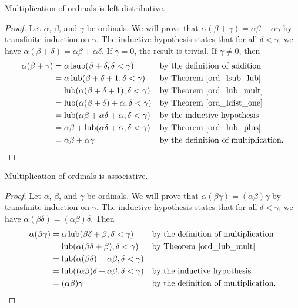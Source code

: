 \documentclass[../../math.tex]{subfiles}
\begin{document}
\begin{instance}
    Multiplication of ordinals is left distributive.
\end{instance}
\begin{proof}
    Let $\alpha$, $\beta$, and $\gamma$ be ordinals.  We will prove that
    $\alpha(\beta + \gamma) = \alpha \beta + \alpha \gamma$ by transfinite
    induction on $\gamma$.  The inductive hypothesis states that for all $\delta
    < \gamma$, we have $\alpha(\beta + \delta) = \alpha \beta + \alpha \delta$.
    If $\gamma = 0$, the result is trivial.  If $\gamma \neq 0$, then
    \begin{align*}
        \alpha(\beta + \gamma)
        &= \alpha \operatorname{lsub}(\beta + \delta, \delta < \gamma)
            && \text{by the definition of addition} \\
        &= \alpha \operatorname{lub}(\beta + \delta + 1, \delta < \gamma)
            && \text{by Theorem \ref{ord_lsub_lub}} \\
        &= \operatorname{lub}(\alpha(\beta + \delta + 1), \delta < \gamma)
            && \text{by Theorem \ref{ord_lub_mult}} \\
        &= \operatorname{lub}(\alpha(\beta + \delta) + \alpha, \delta < \gamma)
            && \text{by Theorem \ref{ord_ldist_one}} \\
        &= \operatorname{lub}(\alpha\beta + \alpha\delta + \alpha, \delta < \gamma)
            && \text{by the inductive hypothesis} \\
        &= \alpha\beta + \operatorname{lub}(\alpha\delta + \alpha, \delta < \gamma)
            && \text{by Theorem \ref{ord_lub_plus}} \\
        &= \alpha\beta + \alpha\gamma
            && \text{by the definition of multiplication.}
    \end{align*}
\end{proof}

\begin{instance}
    Multiplication of ordinals is associative.
\end{instance}
\begin{proof}
    Let $\alpha$, $\beta$, and $\gamma$ be ordinals.  We will prove that
    $\alpha(\beta\gamma) = (\alpha \beta) \gamma$ by transfinite
    induction on $\gamma$.  The inductive hypothesis states that for all $\delta
    < \gamma$, we have $\alpha(\beta\delta) = (\alpha \beta) \delta$.  Then
    \begin{align*}
        \alpha(\beta\gamma)
        &= \alpha \operatorname{lub}(\beta \delta + \beta, \delta < \gamma)
            && \text{by the definition of multiplication} \\
        &= \operatorname{lub}(\alpha(\beta \delta + \beta), \delta < \gamma)
            && \text{by Theorem \ref{ord_lub_mult}} \\
        &= \operatorname{lub}(\alpha(\beta \delta) + \alpha \beta, \delta < \gamma)
            && \\
        &= \operatorname{lub}((\alpha\beta) \delta + \alpha \beta, \delta < \gamma)
            && \text{by the inductive hypothesis} \\
        &= (\alpha\beta) \gamma
            && \text{by the definition of multiplication.}
    \end{align*}
\end{proof}
\end{document}
